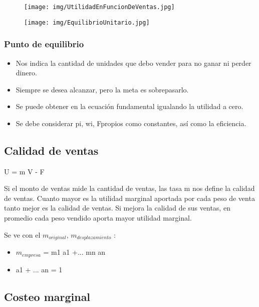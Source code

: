 \documentclass[titlepage,a4paper]{article}
\begin{document}
\begin{figure}[!htb]
    \centering
    \texttt{[image: img/UtilidadEnFuncionDeVentas.jpg]}
\end{figure}

\begin{figure}[!htb]
    \centering
    \texttt{[image: img/EquilibrioUnitario.jpg]}
\end{figure}

\subsubsection*{Punto de equilibrio}
\begin{itemize}
\item Nos indica la cantidad de unidades que debo vender para no ganar ni perder dinero.
\item Siempre se desea alcanzar, pero la meta es sobrepasarlo.
\item Se puede obtener en la ecuación fundamental igualando la utilidad a cero.
\item Se debe considerar pi, wi, Fpropios como constantes, así como la eficiencia.
\end{itemize}


\subsection*{Calidad de ventas}
U = m V - F

\medskip

Si el monto de ventas mide la cantidad de ventas, las tasa m nos define la calidad de ventas. Cuanto mayor es la utilidad marginal aportada por cada peso de venta tanto mejor es la calidad de ventas. Si mejora la calidad de sus ventas, en promedio cada peso vendido aporta mayor utilidad marginal.

Se ve con el $m_{original}$, $m_{desplazamiento}$ :

\begin{itemize}
\item $m_{empresa}$ = m1 a1 +... mn an
\item a1 + ... an = 1
\end{itemize}



\subsection*{Costeo marginal}
\end{document}
